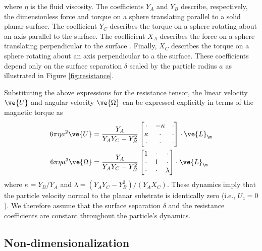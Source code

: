 where $\eta$ is the fluid viscosity. The coefficients $Y_A$ and $Y_B$ describe, respectively, the dimensionless force and torque on a sphere translating parallel to a solid planar surface.\autocite{ONeill1964a} The coefficient $Y_C$ describes the torque on a sphere rotating about an axis parallel to the surface.\autocite{Dean1963} The coefficient $X_A$ describes the force on a sphere translating perpendicular to the surface \autocite{Brenner1961a}.  Finally, $X_C$ describes the torque on a sphere rotating about an axis perpendicular to a the surface. \autocite{Jeffrey1915} These coefficients depend only on the surface separation $\delta$ scaled by the particle radius $a$ as illustrated in Figure \ref{fig:resistance}.

Substituting the above expressions for the resistance tensor, the linear velocity $\ve{U}$ and angular velocity $\ve{\Omega}$ can be expressed explicitly in terms of the magnetic torque as
\begin{align}
    6\pi\eta a^2 \ve{U} &= \frac{Y_A}{Y_A Y_C - Y_B^2}\begin{bmatrix} 
        \cdot & -\kappa & \cdot \\
        \kappa & \cdot & \cdot \\
        \cdot & \cdot & \cdot  \end{bmatrix} \cdot \ve{L}_{\m} \label{eq:U}
    \\
    6\pi\eta a^3 \ve{\Omega} &= \frac{Y_A}{Y_A Y_C - Y_B^2}\begin{bmatrix} 
        1 & \cdot & \cdot \\
        \cdot & 1 & \cdot \\
        \cdot & \cdot & \lambda  \end{bmatrix} \cdot \ve{L}_{\m} \label{eq:W}
\end{align}
where $\kappa = Y_B/Y_A$ and $\lambda=(Y_A Y_C -Y_B^2)/(Y_A X_C)$. These dynamics imply that the particle velocity normal to the planar substrate is identically zero (i.e., $U_z=0$). We therefore assume that the surface separation $\delta$ and the resistance coefficients are constant throughout the particle's dynamics. 

\subsection*{Non-dimensionalization}

